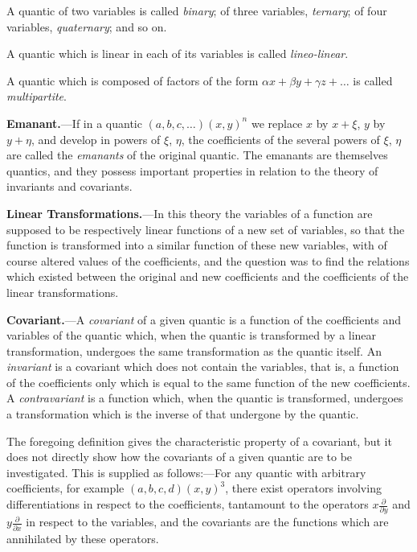 \documentclass[11pt,a4paper]{book}
\begin{document}
A quantic of two variables is called \textit{binary}; of three variables, \textit{ternary}; of four variables, \textit{quaternary}; and so on.

A quantic which is linear in each of its variables is called \textit{lineo-linear}.

A quantic which is composed of factors of the form $\alpha x + \beta y + \gamma z + \ldots$ is called \textit{multipartite}.

\vspace{1em}

\noindent\textbf{Emanant.}---If in a quantic $(a, b, c, \ldots)(x, y)^n$ we replace $x$ by $x + \xi$, $y$ by $y + \eta$, and develop in powers of $\xi$, $\eta$, the coefficients of the several powers of $\xi$, $\eta$ are called the \textit{emanants} of the original quantic. The emanants are themselves quantics, and they possess important properties in relation to the theory of invariants and covariants.

\vspace{1em}

\noindent\textbf{Linear Transformations.}---In this theory the variables of a function are supposed to be respectively linear functions of a new set of variables, so that the function is transformed into a similar function of these new variables, with of course altered values of the coefficients, and the question was to find the relations which existed between the original and new coefficients and the coefficients of the linear transformations.

\vspace{1em}

\noindent\textbf{Covariant.}---A \textit{covariant} of a given quantic is a function of the coefficients and variables of the quantic which, when the quantic is transformed by a linear transformation, undergoes the same transformation as the quantic itself. An \textit{invariant} is a covariant which does not contain the variables, that is, a function of the coefficients only which is equal to the same function of the new coefficients. A \textit{contravariant} is a function which, when the quantic is transformed, undergoes a transformation which is the inverse of that undergone by the quantic.

The foregoing definition gives the characteristic property of a covariant, but it does not directly show how the covariants of a given quantic are to be investigated. This is supplied as follows:---For any quantic with arbitrary coefficients, for example $(a, b, c, d)(x, y)^3$, there exist operators involving differentiations in respect to the coefficients, tantamount to the operators $x\frac{\partial}{\partial y}$ and $y\frac{\partial}{\partial x}$ in respect to the variables, and the covariants are the functions which are annihilated by these operators.
\end{document}
